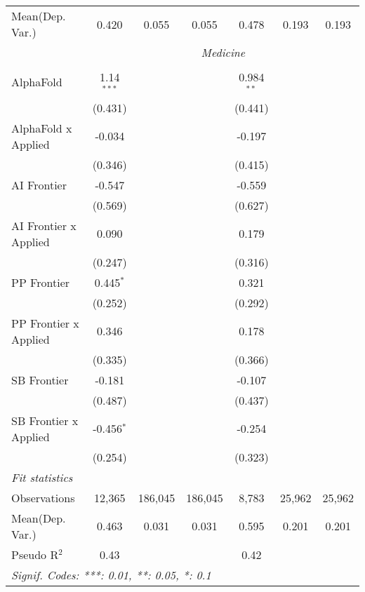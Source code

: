 \begin{tabular}{lcccccc}
Mean(Dep. Var.) & 0.420 & 0.055 & 0.055 & 0.478 & 0.193 & 0.193 \\
 & \multicolumn{6}{c}{\textit{Medicine}} \\ \\
   AlphaFold             & 1.14$^{***}$ &         &         & 0.984$^{**}$ &        &   \\   
                         & (0.431)      &         &         & (0.441)      &        &   \\   
   AlphaFold x Applied   & -0.034       &         &         & -0.197       &        &   \\   
                         & (0.346)      &         &         & (0.415)      &        &   \\   
   AI Frontier           & -0.547       &         &         & -0.559       &        &   \\   
                         & (0.569)      &         &         & (0.627)      &        &   \\   
   AI Frontier x Applied & 0.090        &         &         & 0.179        &        &   \\   
                         & (0.247)      &         &         & (0.316)      &        &   \\   
   PP Frontier           & 0.445$^{*}$  &         &         & 0.321        &        &   \\   
                         & (0.252)      &         &         & (0.292)      &        &   \\   
   PP Frontier x Applied & 0.346        &         &         & 0.178        &        &   \\   
                         & (0.335)      &         &         & (0.366)      &        &   \\   
   SB Frontier           & -0.181       &         &         & -0.107       &        &   \\   
                         & (0.487)      &         &         & (0.437)      &        &   \\   
   SB Frontier x Applied & -0.456$^{*}$ &         &         & -0.254       &        &   \\   
                         & (0.254)      &         &         & (0.323)      &        &   \\   
   \midrule
   \emph{Fit statistics}\\
   Observations          & 12,365       & 186,045 & 186,045 & 8,783        & 25,962 & 25,962\\  
Mean(Dep. Var.) & 0.463 & 0.031 & 0.031 & 0.595 & 0.201 & 0.201 \\
   Pseudo R$^2$          & 0.43         &         &         & 0.42         &        & \\  
   \midrule \midrule
   \multicolumn{7}{l}{\emph{Signif. Codes: ***: 0.01, **: 0.05, *: 0.1}}\\
\end{tabular}
\par\endgroup
